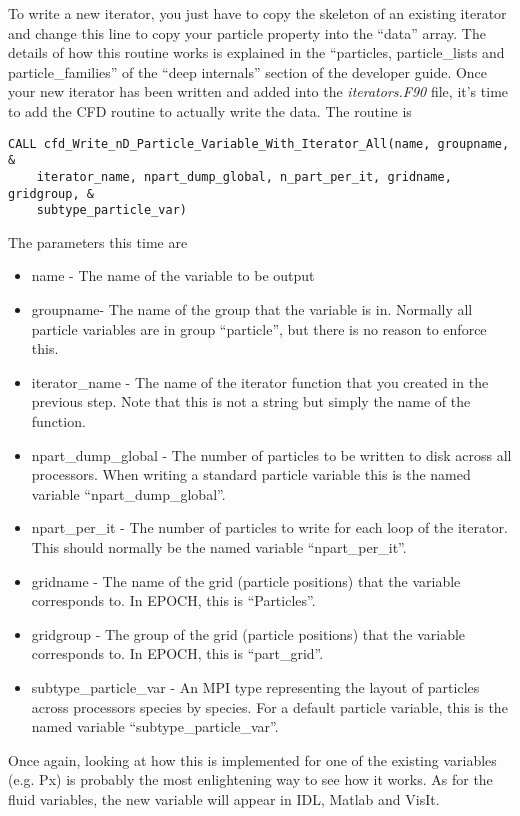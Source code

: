 \documentclass[12pt,a4paper]{article}
\newcommand{\simpleboxverbatim}{\begin{Verbatim}[obeytabs=true,frame=single,
  framerule=0.5mm,rulecolor=\color{warwickmid},formatcom=\color{black}]}
\newcommand{\EPOCH}{{\color{warwickdark}\fontfamily{phv}\selectfont{EPOCH}}}
\begin{document}
To write a new iterator, you just have to copy the skeleton of an existing
iterator and change this line to copy your particle property into the ``data''
array. The details of how this routine works is explained in the ``particles,
particle\_lists and particle\_families'' of the ``deep internals'' section of
the developer guide. Once your new iterator has been written and added into the
{\it iterators.F90} file, it's time to add the CFD routine to actually write
the data. The routine is
\simpleboxverbatim
CALL cfd_Write_nD_Particle_Variable_With_Iterator_All(name, groupname, &
    iterator_name, npart_dump_global, n_part_per_it, gridname, gridgroup, &
    subtype_particle_var)
\end{Verbatim}

The parameters this time are
\begin{itemize}
\item name - The name of the variable to be output
\item groupname- The name of the group that the variable is in. Normally all
  {\EPOCH} particle variables are in group ``particle'', but there is no reason
  to enforce this.
\item iterator\_name - The name of the iterator function that you created in
  the previous step. Note that this is not a string but simply the name of the
  function.
\item npart\_dump\_global - The number of particles to be written to disk
  across all processors. When writing a standard particle variable this is the
  named variable ``npart\_dump\_global''.
\item npart\_per\_it - The number of particles to write for each loop of the
  iterator. This should normally be the named variable ``npart\_per\_it''.
\item gridname - The name of the grid (particle positions) that the variable
  corresponds to. In EPOCH, this is ``Particles''.
\item gridgroup - The group of the grid (particle positions) that the variable
  corresponds to. In EPOCH, this is ``part\_grid''.
\item subtype\_particle\_var - An MPI type representing the layout of particles
  across processors species by species. For a default particle variable, this
  is the named variable ``subtype\_particle\_var''.
\end{itemize}

Once again, looking at how this is implemented for one of the existing
variables (e.g. Px) is probably the most enlightening way to see how it
works. As for the fluid variables, the new variable will appear in IDL, Matlab
and VisIt.
\end{document}
